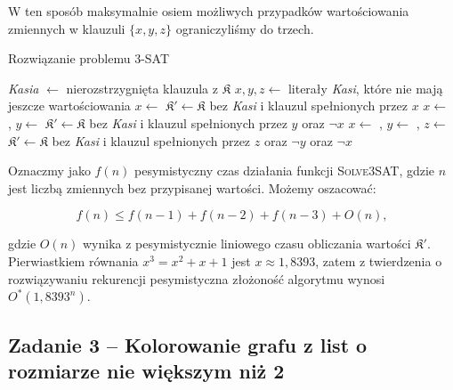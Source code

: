 W ten sposób maksymalnie osiem możliwych przypadków wartościowania zmiennych w klauzuli $\{x, y, z\}$ ograniczyliśmy do trzech. 

\begin{algorithm}[H]
	\caption{Rozwiązanie problemu 3-SAT}
	\begin{algorithmic}[1]
		\State \Return \true
		\EndIf
		
		\State 
		\State \textit{Kasia} $\gets$ nierozstrzygnięta klauzula z $\mathfrak{K}$ 
		\State \Return \false
		\EndIf
		\State $x, y, z \gets $ literały \textit{Kasi}, które nie mają jeszcze wartościowania
		\State
		\State $x \gets $ \true
		\State $\mathfrak{K}' \gets \mathfrak{K}$ bez \textit{Kasi} i klauzul spełnionych przez $x$
		\State \Return \true
		\EndIf
		\State
		\State $x \gets $ \false, $y \gets $ \true {}
		\State $\mathfrak{K}' \gets \mathfrak{K}$ bez \textit{Kasi} i klauzul spełnionych przez $y$ oraz $\lnot x$
		\State \Return \true
		\EndIf
		\State
		\State $x \gets $ \false, $y \gets $ \false, $z \gets $ \true {}
		\State $\mathfrak{K}' \gets \mathfrak{K}$ bez \textit{Kasi} i klauzul spełnionych przez $z$ oraz $\lnot y$ oraz $\lnot x$
		\State \Return \true
		\EndIf
		\EndProcedure
	\end{algorithmic}
\end{algorithm}

Oznaczmy jako $f(n)$ pesymistyczny czas działania funkcji \textsc{Solve3SAT}, gdzie $n$ jest liczbą zmiennych bez przypisanej wartości. Możemy oszacować:

\[
f(n) \leq f(n-1) + f(n-2) + f(n-3) + O(n),
\]

gdzie $O(n)$ wynika z pesymistycznie liniowego czasu obliczania wartości $\mathfrak{K}'$. Pierwiastkiem równania
$x^3 = x^2 + x + 1$
jest $x \approx 1{,}8393$, zatem z twierdzenia o rozwiązywaniu rekurencji pesymistyczna złożoność algorytmu wynosi $O^*(1{,}8393^n)$.

\subsection{Zadanie 3 -- Kolorowanie grafu z list o rozmiarze nie większym niż 2}

